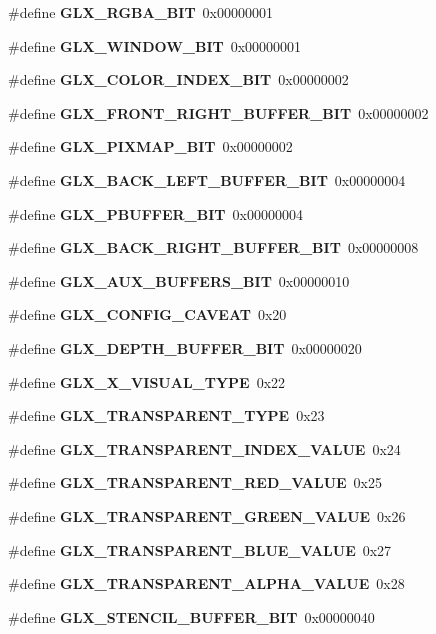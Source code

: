 \begin{DoxyCompactItemize}
\item 
\#define {\bf G\+L\+X\+\_\+\+R\+G\+B\+A\+\_\+\+B\+IT}~0x00000001
\item 
\#define {\bf G\+L\+X\+\_\+\+W\+I\+N\+D\+O\+W\+\_\+\+B\+IT}~0x00000001
\item 
\#define {\bf G\+L\+X\+\_\+\+C\+O\+L\+O\+R\+\_\+\+I\+N\+D\+E\+X\+\_\+\+B\+IT}~0x00000002
\item 
\#define {\bf G\+L\+X\+\_\+\+F\+R\+O\+N\+T\+\_\+\+R\+I\+G\+H\+T\+\_\+\+B\+U\+F\+F\+E\+R\+\_\+\+B\+IT}~0x00000002
\item 
\#define {\bf G\+L\+X\+\_\+\+P\+I\+X\+M\+A\+P\+\_\+\+B\+IT}~0x00000002
\item 
\#define {\bf G\+L\+X\+\_\+\+B\+A\+C\+K\+\_\+\+L\+E\+F\+T\+\_\+\+B\+U\+F\+F\+E\+R\+\_\+\+B\+IT}~0x00000004
\item 
\#define {\bf G\+L\+X\+\_\+\+P\+B\+U\+F\+F\+E\+R\+\_\+\+B\+IT}~0x00000004
\item 
\#define {\bf G\+L\+X\+\_\+\+B\+A\+C\+K\+\_\+\+R\+I\+G\+H\+T\+\_\+\+B\+U\+F\+F\+E\+R\+\_\+\+B\+IT}~0x00000008
\item 
\#define {\bf G\+L\+X\+\_\+\+A\+U\+X\+\_\+\+B\+U\+F\+F\+E\+R\+S\+\_\+\+B\+IT}~0x00000010
\item 
\#define {\bf G\+L\+X\+\_\+\+C\+O\+N\+F\+I\+G\+\_\+\+C\+A\+V\+E\+AT}~0x20
\item 
\#define {\bf G\+L\+X\+\_\+\+D\+E\+P\+T\+H\+\_\+\+B\+U\+F\+F\+E\+R\+\_\+\+B\+IT}~0x00000020
\item 
\#define {\bf G\+L\+X\+\_\+\+X\+\_\+\+V\+I\+S\+U\+A\+L\+\_\+\+T\+Y\+PE}~0x22
\item 
\#define {\bf G\+L\+X\+\_\+\+T\+R\+A\+N\+S\+P\+A\+R\+E\+N\+T\+\_\+\+T\+Y\+PE}~0x23
\item 
\#define {\bf G\+L\+X\+\_\+\+T\+R\+A\+N\+S\+P\+A\+R\+E\+N\+T\+\_\+\+I\+N\+D\+E\+X\+\_\+\+V\+A\+L\+UE}~0x24
\item 
\#define {\bf G\+L\+X\+\_\+\+T\+R\+A\+N\+S\+P\+A\+R\+E\+N\+T\+\_\+\+R\+E\+D\+\_\+\+V\+A\+L\+UE}~0x25
\item 
\#define {\bf G\+L\+X\+\_\+\+T\+R\+A\+N\+S\+P\+A\+R\+E\+N\+T\+\_\+\+G\+R\+E\+E\+N\+\_\+\+V\+A\+L\+UE}~0x26
\item 
\#define {\bf G\+L\+X\+\_\+\+T\+R\+A\+N\+S\+P\+A\+R\+E\+N\+T\+\_\+\+B\+L\+U\+E\+\_\+\+V\+A\+L\+UE}~0x27
\item 
\#define {\bf G\+L\+X\+\_\+\+T\+R\+A\+N\+S\+P\+A\+R\+E\+N\+T\+\_\+\+A\+L\+P\+H\+A\+\_\+\+V\+A\+L\+UE}~0x28
\item 
\#define {\bf G\+L\+X\+\_\+\+S\+T\+E\+N\+C\+I\+L\+\_\+\+B\+U\+F\+F\+E\+R\+\_\+\+B\+IT}~0x00000040

\end{DoxyCompactItemize}
